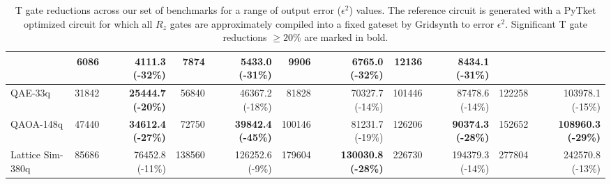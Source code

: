 \begin{table}[t]
\begin{tabular}{|l|r | r|r | r|r | r|r | r|r | r|}
& 6086 & \textbf{4111.3 (-32\%)} 
& 7874 & \textbf{5433.0 (-31\%)} 
& 9906 & \textbf{6765.0 (-32\%)} 
& 12136 & \textbf{8434.1 (-31\%)} \\
\hline
QAE-33q 
& 31842 & \textbf{25444.7 (-20\%)} 
& 56840 & 46367.2 (-18\%) 
& 81828 & 70327.7 (-14\%) 
& 101446 & 87478.6 (-14\%) 
& 122258 & 103978.1 (-15\%) \\
\hline
QAOA-148q 
& 47440 & \textbf{34612.4 (-27\%)} 
& 72750 & \textbf{39842.4 (-45\%)} 
& 100146 & 81231.7 (-19\%) 
& 126206 & \textbf{90374.3 (-28\%)} 
& 152652 & \textbf{108960.3 (-29\%)} \\
\hline
Lattice Sim-380q 
& 85686 & 76452.8 (-11\%) 
& 138560 & 126252.6 (-9\%) 
& 179604 & \textbf{130030.8 (-28\%)} 
& 226730 & 194379.3 (-14\%) 
& 277804 & 242570.8 (-13\%) \\
\hline
\end{tabular}
\caption{T gate reductions across our set of benchmarks for a range of output error ($\epsilon^2$) values. The reference circuit is generated with a PyTket optimized circuit for which all $R_z$ gates are approximately compiled into a fixed gateset by Gridsynth to error $\epsilon^2$. Significant T gate reductions $\geq 20\%$ are marked in bold.}
\label{tab:ft}
\end{table}


